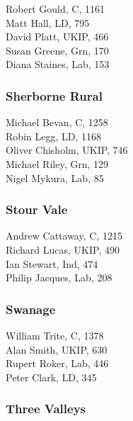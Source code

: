 \documentclass[a4paper,openany,10pt]{book}
\begin{document}


Robert Gould, C, 1161\\
Matt Hall, LD, 795\\
David Platt, UKIP, 466\\
Susan Greene, Grn, 170\\
Diana Staines, Lab, 153\\


\subsubsection*{Sherborne Rural}



Michael Bevan, C, 1258\\
Robin Legg, LD, 1168\\
Oliver Chisholm, UKIP, 746\\
Michael Riley, Grn, 129\\
Nigel Mykura, Lab, 85\\


\subsubsection*{Stour Vale}



Andrew Cattaway, C, 1215\\
Richard Lucas, UKIP, 490\\
Ian Stewart, Ind, 474\\
Philip Jacques, Lab, 208\\


\subsubsection*{Swanage}



William Trite, C, 1378\\
Alan Smith, UKIP, 630\\
Rupert Roker, Lab, 446\\
Peter Clark, LD, 345\\


\subsubsection*{Three Valleys}
\end{document}
